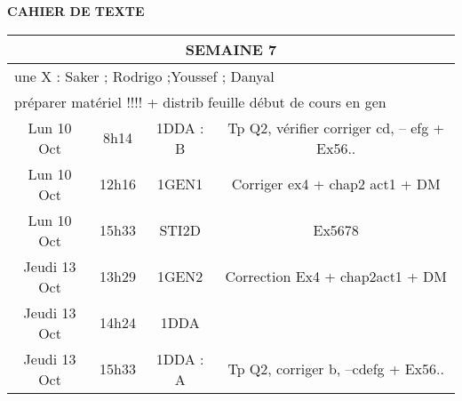 \documentclass[10pt]{article}
\newcommand{\mypage}[1]{ 
		\begin{minipage}[c]{0.45\textwidth}
			\vspace{5pt}
			{#1}
			\vspace{5pt}
		\end{minipage}
}
\newcommand{\seancea}{\mypage{Tp Q2, vérifier corriger cd, -- efg + Ex56..}}
\newcommand{\seanceb}{\mypage{Corriger ex4 + chap2 act1 + DM}}
\newcommand{\seancec}{\mypage{Ex5678}}
\newcommand{\seanced}{\mypage{Correction Ex4 + chap2act1 + DM}}
\newcommand{\seancee}{\mypage{}}
\newcommand{\seancef}{\mypage{Tp Q2, corriger b, --cdefg + Ex56..}}
\begin{document}
\begin{center}
	\textbf{CAHIER DE TEXTE}
\end{center}

\setlength{\tabcolsep}{13pt}
\renewcommand{\arraystretch}{2.5}
\begin{longtable}{@{}|c|c|c|c|@{}} \toprule
	\midrule\multicolumn{4}{||c||}{SEMAINE 7}                                            \\\midrule
	\multicolumn{4}{|l|}{une X : Saker ; Rodrigo ;Youssef ; Danyal}                      \\\midrule
	\multicolumn{4}{|l|}{préparer matériel !!!! + distrib feuille début de cours en gen} \\\midrule
	Lun 10 Oct   & 8h14  & 1DDA : B & \seancea                                           \\\midrule
	Lun 10 Oct   & 12h16 & 1GEN1    & \seanceb                                           \\\midrule
	Lun 10 Oct   & 15h33 & STI2D    & \seancec                                           \\\midrule\midrule
	Jeudi 13 Oct & 13h29 & 1GEN2    & \seanced                                           \\\midrule
	Jeudi 13 Oct & 14h24 & 1DDA     & \seancee                                           \\\midrule
	Jeudi 13 Oct & 15h33 & 1DDA : A & \seancef                                           \\


	\bottomrule
\end{longtable}
\end{document}
